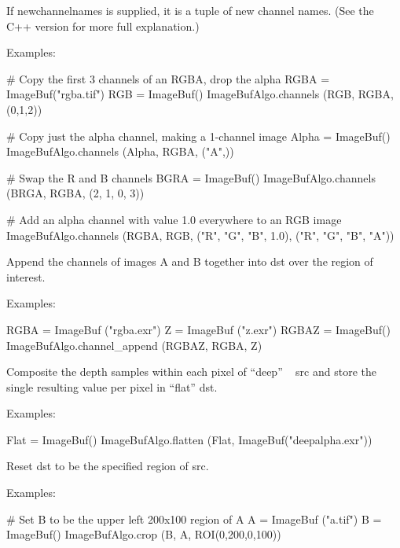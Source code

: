 If {\cf newchannelnames} is supplied, it is a tuple of new channel
names. (See the C++ version for more full explanation.)

\smallskip
\noindent Examples:
\begin{code}
    # Copy the first 3 channels of an RGBA, drop the alpha
    RGBA = ImageBuf("rgba.tif")
    RGB = ImageBuf()
    ImageBufAlgo.channels (RGB, RGBA, (0,1,2))

    # Copy just the alpha channel, making a 1-channel image
    Alpha = ImageBuf()
    ImageBufAlgo.channels (Alpha, RGBA, ("A",))

    # Swap the R and B channels
    BGRA = ImageBuf()
    ImageBufAlgo.channels (BRGA, RGBA, (2, 1, 0, 3))

    # Add an alpha channel with value 1.0 everywhere to an RGB image
    ImageBufAlgo.channels (RGBA, RGB, ("R", "G", "B", 1.0),
                            ("R", "G", "B", "A"))
\end{code}
\apiend


 
Append the channels of images {\cf A} and {\cf B} together into {\cf dst} over
the region of interest.

\smallskip
\noindent Examples:
\begin{code}
    RGBA = ImageBuf ("rgba.exr")
    Z = ImageBuf ("z.exr")
    RGBAZ = ImageBuf()
    ImageBufAlgo.channel_append (RGBAZ, RGBA, Z)
\end{code}
\apiend


  

Composite the depth samples within each pixel of ``deep'' \ImageBuf\ {\cf
src} and store the single  resulting value per pixel in ``flat'' \ImageBuf
{\cf dst}.

\smallskip
\noindent Examples:
\begin{code}
    Flat = ImageBuf()
    ImageBufAlgo.flatten (Flat, ImageBuf("deepalpha.exr"))
\end{code}
\apiend


 
Reset {\cf dst} to be the specified region of {\cf src}.

\smallskip
\noindent Examples:
\begin{code}
    # Set B to be the upper left 200x100 region of A
    A = ImageBuf ("a.tif")
    B = ImageBuf()
    ImageBufAlgo.crop (B, A, ROI(0,200,0,100))
\end{code}
\apiend



